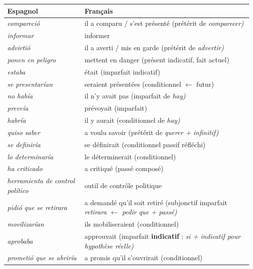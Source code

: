 \documentclass[11pt]{article}
\newcommand{\esp}[1]{\ifmmode\text{\textit{#1}}\else\begingroup\selectlanguage{spanish}\itshape #1\endgroup\fi}
\begin{document}
\begin{center}
\begin{tabularx}{\linewidth}{|X|X|}
\hline
\rowcolor{popblueL} \textbf{Espagnol} & \textbf{Français} \\ \hline
\esp{compareció} & il a comparu / s'est présenté (prétérit de \esp{comparecer}) \\ \hline
\esp{informar} & informer \\ \hline
\esp{advirtió} & il a averti / mis en garde (prétérit de \esp{advertir}) \\ \hline
\esp{ponen en peligro} & mettent en danger (présent indicatif, fait actuel) \\ \hline
\esp{estaba} & était (imparfait indicatif) \\ \hline
\esp{se presentarían} & seraient présentées (conditionnel $\leftarrow$ futur) \\ \hline
\esp{no había} & il n'y avait pas (imparfait de \esp{hay}) \\ \hline
\esp{preveía} & prévoyait (imparfait) \\ \hline
\esp{habría} & il y aurait (conditionnel de \esp{hay}) \\ \hline
\esp{quiso saber} & a voulu savoir (prétérit de \esp{querer} + infinitif) \\ \hline
\esp{se definiría} & se définirait (conditionnel passif réfléchi) \\ \hline
\esp{lo determinaría} & le déterminerait (conditionnel) \\ \hline
\esp{ha criticado} & a critiqué (passé composé) \\ \hline
\esp{herramienta de control político} & outil de contrôle politique \\ \hline
\esp{pidió que se retirara} & a demandé qu'il soit retiré (subjonctif imparfait \esp{retirara} $\leftarrow$ \esp{pedir que} + passé) \\ \hline
\esp{movilizarían} & ils mobiliseraient (conditionnel) \\ \hline
\esp{aprobaba} & approuvait (imparfait \textbf{indicatif} : \esp{si} + indicatif pour hypothèse réelle) \\ \hline
\esp{prometió que se abriría} & a promis qu'il s'ouvrirait (conditionnel) \\ \hline
\end{tabularx}
\end{center}
\end{document}
